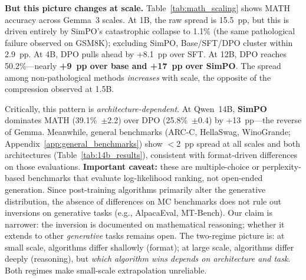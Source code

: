 \documentclass{article}
\begin{document}
\textbf{But this picture changes at scale.} Table~\ref{tab:math_scaling} shows MATH accuracy across Gemma~3 scales. At 1B, the raw spread is 15.5~pp, but this is driven entirely by SimPO's catastrophic collapse to 1.1\% (the same pathological failure observed on GSM8K); excluding SimPO, Base/SFT/DPO cluster within 2.9~pp. At 4B, DPO pulls ahead by +8.1~pp over SFT. At 12B, DPO reaches 50.2\%---nearly \textbf{+9~pp over base and +17~pp over SimPO}. The spread among non-pathological methods \emph{increases} with scale, the opposite of the compression observed at 1.5B.

Critically, this pattern is \emph{architecture-dependent}. At Qwen~14B, \textbf{SimPO} dominates MATH (39.1\%~$\pm$2.2) over DPO (25.8\%~$\pm$0.4) by +13~pp---the reverse of Gemma. Meanwhile, general benchmarks (ARC-C, HellaSwag, WinoGrande; Appendix~\ref{app:general_benchmarks}) show $<$2~pp spread at all scales and both architectures (Table~\ref{tab:14b_results}), consistent with format-driven differences on those evaluations. \textbf{Important caveat:} these are multiple-choice or perplexity-based benchmarks that evaluate log-likelihood ranking, not open-ended generation. Since post-training algorithms primarily alter the generative distribution, the absence of differences on MC benchmarks does not rule out inversions on generative tasks (e.g., AlpacaEval, MT-Bench). Our claim is narrower: the inversion is documented on mathematical reasoning; whether it extends to other \emph{generative} tasks remains open. The two-regime picture is: at small scale, algorithms differ shallowly (format); at large scale, algorithms differ deeply (reasoning), but \emph{which algorithm wins depends on architecture and task}. Both regimes make small-scale extrapolation unreliable.
\end{document}
